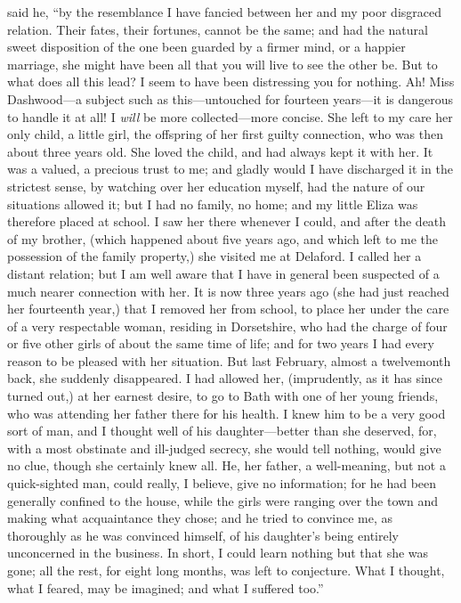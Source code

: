  said he, “by the resemblance I have fancied between her and my poor disgraced relation. Their fates, their fortunes, cannot be the same; and had the natural sweet disposition of the one been guarded by a firmer mind, or a happier marriage, she might have been all that you will live to see the other be. But to what does all this lead? I seem to have been distressing you for nothing. Ah! Miss Dashwood---a subject such as this---untouched for fourteen years---it is dangerous to handle it at all! I {\em will} be more collected---more concise. She left to my care her only child, a little girl, the offspring of her first guilty connection, who was then about three years old. She loved the child, and had always kept it with her. It was a valued, a precious trust to me; and gladly would I have discharged it in the strictest sense, by watching over her education myself, had the nature of our situations allowed it; but I had no family, no home; and my little Eliza was therefore placed at school. I saw her there whenever I could, and after the death of my brother, (which happened about five years ago, and which left to me the possession of the family property,) she visited me at Delaford. I called her a distant relation; but I am well aware that I have in general been suspected of a much nearer connection with her. It is now three years ago (she had just reached her fourteenth year,) that I removed her from school, to place her under the care of a very respectable woman, residing in Dorsetshire, who had the charge of four or five other girls of about the same time of life; and for two years I had every reason to be pleased with her situation. But last February, almost a twelvemonth back, she suddenly disappeared. I had allowed her, (imprudently, as it has since turned out,) at her earnest desire, to go to Bath with one of her young friends, who was attending her father there for his health. I knew him to be a very good sort of man, and I thought well of his daughter---better than she deserved, for, with a most obstinate and ill-judged secrecy, she would tell nothing, would give no clue, though she certainly knew all. He, her father, a well-meaning, but not a quick-sighted man, could really, I believe, give no information; for he had been generally confined to the house, while the girls were ranging over the town and making what acquaintance they chose; and he tried to convince me, as thoroughly as he was convinced himself, of his daughter's being entirely unconcerned in the business. In short, I could learn nothing but that she was gone; all the rest, for eight long months, was left to conjecture. What I thought, what I feared, may be imagined; and what I suffered too.”

